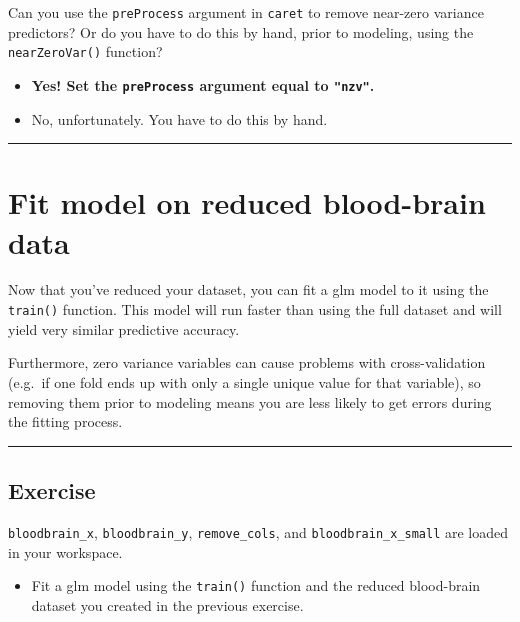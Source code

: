 \documentclass[
]{book}
\providecommand{\tightlist}{%
  \setlength{\itemsep}{0pt}\setlength{\parskip}{0pt}}
\begin{document}
Can you use the \texttt{preProcess} argument in \texttt{caret} to remove near-zero variance predictors? Or do you have to do this by hand, prior to modeling, using the \texttt{nearZeroVar()} function?

\begin{itemize}
\item
  \textbf{Yes! Set the \texttt{preProcess} argument equal to \texttt{"nzv"}.}
\item
  No, unfortunately. You have to do this by hand.
\end{itemize}

\begin{center}\rule{0.5\linewidth}{0.5pt}\end{center}

\hypertarget{fit-model-on-reduced-blood-brain-data}{%
\section{Fit model on reduced blood-brain data}\label{fit-model-on-reduced-blood-brain-data}}

Now that you've reduced your dataset, you can fit a glm model to it using the \texttt{train()} function. This model will run faster than using the full dataset and will yield very similar predictive accuracy.

Furthermore, zero variance variables can cause problems with cross-validation (e.g.~if one fold ends up with only a single unique value for that variable), so removing them prior to modeling means you are less likely to get errors during the fitting process.

\begin{center}\rule{0.5\linewidth}{0.5pt}\end{center}

\hypertarget{exercise-27}{%
\subsection*{Exercise}\label{exercise-27}}

\texttt{bloodbrain\_x}, \texttt{bloodbrain\_y}, \texttt{remove\_cols}, and \texttt{bloodbrain\_x\_small} are loaded in your workspace.

\begin{itemize}
\tightlist
\item
  Fit a glm model using the \texttt{train()} function and the reduced blood-brain dataset you created in the previous exercise.
\end{itemize}
\end{document}
